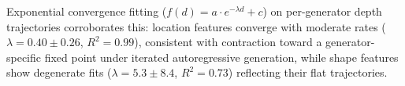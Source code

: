 Exponential convergence fitting ($f(d) {=} a \cdot e^{-\lambda d} + c$) on per-generator depth trajectories corroborates this: location features converge with moderate rates ($\lambda {=} 0.40 \pm 0.26$, $R^2 {=} 0.99$), consistent with contraction toward a generator-specific fixed point under iterated autoregressive generation, while shape features show degenerate fits ($\lambda {=} 5.3 \pm 8.4$, $R^2 {=} 0.73$) reflecting their flat trajectories.
